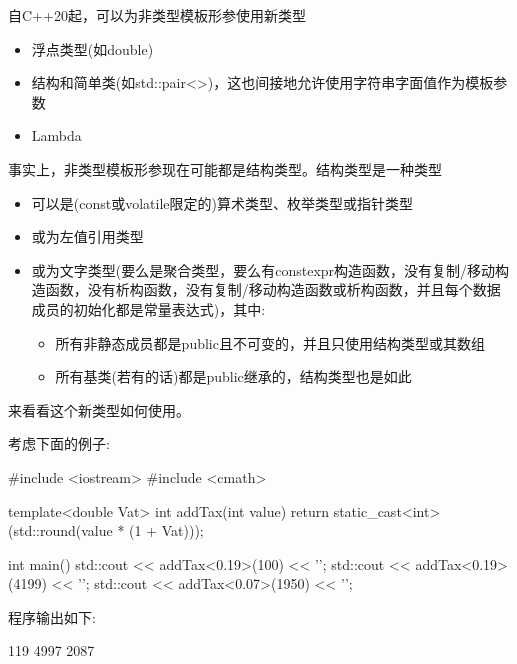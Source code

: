 
自C++20起，可以为非类型模板形参使用新类型

\begin{itemize}
\item 
浮点类型(如double)

\item 
结构和简单类(如std::pair<>)，这也间接地允许使用字符串字面值作为模板参数

\item 
Lambda
\end{itemize}

事实上，非类型模板形参现在可能都是结构类型。结构类型是一种类型

\begin{itemize}
\item 
可以是(const或volatile限定的)算术类型、枚举类型或指针类型

\item 
或为左值引用类型

\item 
或为文字类型(要么是聚合类型，要么有constexpr构造函数，没有复制/移动构造函数，没有析构函数，没有复制/移动构造函数或析构函数，并且每个数据成员的初始化都是常量表达式)，其中:

\begin{itemize}
\item 
所有非静态成员都是public且不可变的，并且只使用结构类型或其数组

\item 
所有基类(若有的话)都是public继承的，结构类型也是如此
\end{itemize}
\end{itemize}

来看看这个新类型如何使用。


考虑下面的例子:


\begin{cpp}
#include <iostream>
#include <cmath>

template<double Vat>
int addTax(int value)
{
	return static_cast<int>(std::round(value * (1 + Vat)));
}

int main()
{
	std::cout << addTax<0.19>(100) << '\n';
	std::cout << addTax<0.19>(4199) << '\n';
	std::cout << addTax<0.07>(1950) << '\n';
}
\end{cpp}

程序输出如下:

\begin{shell}
119
4997
2087
\end{shell}

